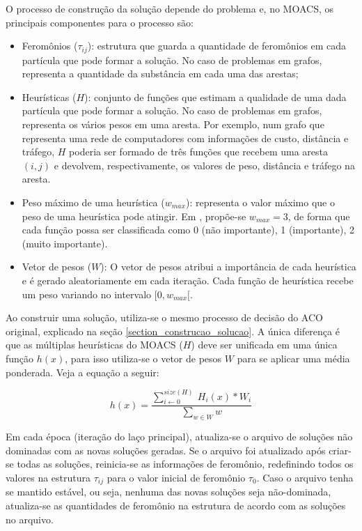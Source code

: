 O processo de construção da solução depende do problema e, no MOACS, os principais componentes para o processo são:

\begin{itemize}  
	\item Feromônios ($\tau_{ij}$): estrutura que guarda a quantidade de feromônios em cada partícula que pode formar a solução. No caso de problemas em grafos, representa a quantidade da substância em cada uma das arestas;
	\item Heurísticas ($H$): conjunto de funções que estimam a qualidade de uma dada partícula que pode formar a solução. No caso de problemas em grafos, representa os vários pesos em uma aresta. Por exemplo, num grafo que representa uma rede de computadores com informações de custo, distância e tráfego, $H$ poderia ser formado de três funções que recebem uma aresta $(i,j)$ e devolvem, respectivamente, os valores de peso, distância e tráfego na aresta.
	\item Peso máximo de uma heurística ($w_{max}$): representa o valor máximo que o peso de uma heurística pode atingir. Em \cite{Riveros2016}, propõe-se $w_{max} = 3$, de forma que cada função possa ser classificada como 0 (não importante), 1 (importante), 2 (muito importante).
	\item Vetor de pesos ($W$): O vetor de pesos atribui a importância de cada heurística e é gerado aleatoriamente em cada iteração. Cada função de heurística recebe um peso variando no intervalo $[0, w_{max}[$.
\end{itemize}

Ao construir uma solução, utiliza-se o mesmo processo de decisão do ACO original, explicado na seção \ref{section_construcao_solucao}. A única diferença é que as múltiplas heurísticas do MOACS ($H$) deve ser unificada em uma única função $h(x)$, para isso utiliza-se o vetor de pesos $W$ para se aplicar uma média ponderada. Veja a equação a seguir:

\[h(x) = \frac{\sum_{i \gets 0}^{size(H)}\ H_i(x) * W_i}{\sum_{w \in W} w}\]

Em cada época (iteração do laço principal), atualiza-se o arquivo de soluções não dominadas com as novas soluções geradas. Se o arquivo foi atualizado após criar-se todas as soluções, reinicia-se as informações de feromônio, redefinindo todos os valores na estrutura $\tau_{ij}$ para o valor inicial de feromônio $\tau_0$. Caso o arquivo tenha se mantido estável, ou seja, nenhuma das novas soluções seja não-dominada, atualiza-se as quantidades de feromônio na estrutura de acordo com as soluções no arquivo.

